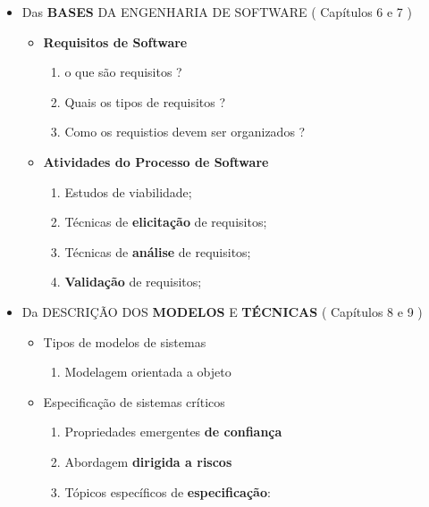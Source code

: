 \documentclass[
]{book}
\providecommand{\tightlist}{%
  \setlength{\itemsep}{0pt}\setlength{\parskip}{0pt}}
\begin{document}
\begin{itemize}
  \begin{itemize}
  \tightlist
  \item
    Das \textbf{BASES} DA ENGENHARIA DE SOFTWARE ( Capítulos 6 e 7 )

    \begin{itemize}
    \tightlist
    \item
      \textbf{Requisitos de Software}

      \begin{enumerate}
      \def\labelenumi{\arabic{enumi}.}
      \tightlist
      \item
        o que são requisitos ?
      \item
        Quais os tipos de requisitos ?
      \item
        Como os requistios devem ser organizados ?
      \end{enumerate}
    \item
      \textbf{Atividades do Processo de Software}

      \begin{enumerate}
      \def\labelenumi{\arabic{enumi}.}
      \tightlist
      \item
        Estudos de viabilidade;
      \item
        Técnicas de \textbf{elicitação} de requisitos;
      \item
        Técnicas de \textbf{análise} de requisitos;
      \item
        \textbf{Validação} de requisitos;
      \end{enumerate}
    \end{itemize}
  \item
    Da DESCRIÇÃO DOS \textbf{MODELOS} E \textbf{TÉCNICAS} ( Capítulos 8 e 9 )

    \begin{itemize}
    \tightlist
    \item
      Tipos de modelos de sistemas

      \begin{enumerate}
      \def\labelenumi{\arabic{enumi}.}
      \tightlist
      \item
        Modelagem orientada a objeto
      \end{enumerate}
    \item
      Especificação de sistemas críticos

      \begin{enumerate}
      \def\labelenumi{\arabic{enumi}.}
      \tightlist
      \item
        Propriedades emergentes \textbf{de confiança}
      \item
        Abordagem \textbf{dirigida a riscos}
      \item
        Tópicos específicos de \textbf{especificação}:


\end{enumerate}
\end{itemize}
\end{itemize}
\end{itemize}
\end{document}
